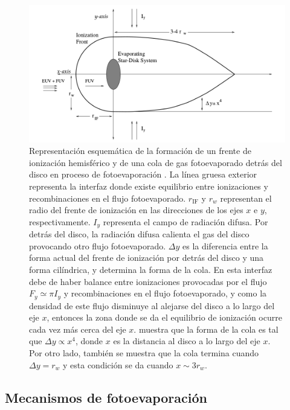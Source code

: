 \begin{figure}
  \centering
  \includegraphics[width=0.8\linewidth]{./Figures/Johnstone-shape}
  \caption[Representación esquemática de un proplyd]{Representación esquemática de la formación de un frente de ionización hemisférico y de una cola de gas fotoevaporado detrás del disco en proceso de fotoevaporación \citep{Johnstone:1998}. La línea gruesa exterior representa la interfaz donde existe equilibrio entre ionizaciones y recombinaciones en el flujo fotoevaporado. $r_{\mathrm{IF}}$ y $r_w$ representan el radio del frente de ionización en las direcciones de los ejes $x$ e $y$, respectivamente. $I_y$ representa el campo de radiación difusa. Por detrás del disco, la radiación difusa calienta el gas del disco provocando otro flujo fotoevaporado. $\Delta y$ es la diferencia entre la forma actual del frente de ionización por detrás del disco y una forma cilíndrica, y determina la forma de la cola. En esta interfaz debe de haber balance entre ionizaciones provocadas por el flujo $F_y \simeq \pi I_y$ y recombinaciones en el flujo fotoevaporado, y como la densidad de este flujo disminuye al alejarse del disco a lo largo del eje $x$, entonces la zona donde se da el equilibrio de ionización ocurre cada vez más cerca del eje $x$. \citet{Johnstone:1998} muestra que la forma de la cola es tal que $\Delta y \propto x^4$, donde $x$ es la distancia al disco a lo largo del eje $x$. Por otro lado, también se muestra que la cola termina cuando $\Delta y = r_w$ y esta condición se da cuando $x \sim 3 r_w$.} %
    \label{fig:prop-shape}
\end{figure}


\subsection{Mecanismos de fotoevaporación \citep{Johnstone:1998}}
\label{sec:photoevaporation}

